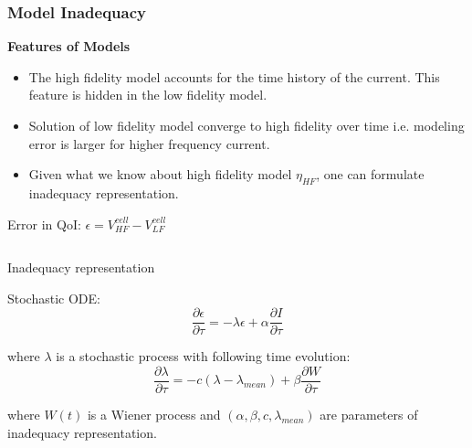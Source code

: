 \documentclass[8pt]{beamer}
\begin{document}
\begin{frame}
\frametitle{Model Inadequacy}
\vfill

\vspace{0.1in}
\textbf{Features of Models}
\begin{itemize}
\item The high fidelity model accounts for the time history of the current. This feature is hidden in the low fidelity model. 
\item Solution of low fidelity model converge to high fidelity over time i.e. modeling error is larger for higher frequency current. 
\item Given what we know about high fidelity model $\eta_{HF}$, one can formulate inadequacy representation. 
\end{itemize}

\begin{center}
Error in QoI: \qquad
$\epsilon = V^{cell}_{HF} - V^{cell}_{LF}$
\end{center}

\vspace{0.in}
\begin{columns}
\begin{column}{.48\textwidth}
\vspace{-0.05in}
\begin{alertblock}{Inadequacy representation}

Stochastic ODE:
\begin{equation*}
\frac{\partial\epsilon}{\partial\tau} = -\lambda\epsilon + \alpha \frac{\partial I}{\partial\tau}
\end{equation*}

where $\lambda$ is a stochastic process with following time evolution:
\begin{equation*}
\frac{\partial\lambda}{\partial\tau} = -c(\lambda - \lambda_{mean}) + \beta \frac{\partial W}{\partial\tau}
\end{equation*}

where $W(t)$ is a Wiener process and $(\alpha, \beta, c, \lambda_{mean})$ are parameters of inadequacy representation. 
\end{alertblock}


\end{column}
\end{columns}
\end{frame}
\end{document}
